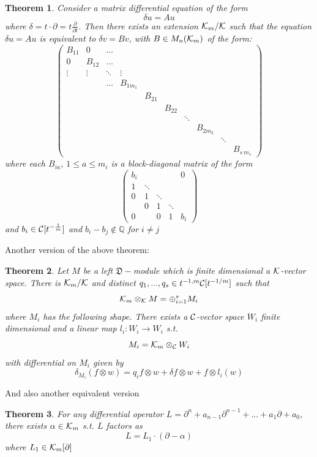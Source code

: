 \documentclass[11pt]{article}
\newtheorem{thm}{Theorem}[section]
\newcommand{\pd}{\partial}
\newcommand{\ratl}{\mathbb Q}
\newcommand{\frakd}{{\mathfrak D}}
\newcommand{\calc}{{\cal C}}
\newcommand{\calk}{{\cal K}}
\newcommand{\lrta}{\longrightarrow}
\begin{document}
\begin{thm}\label{thm:version1}
Consider a matrix differential equation of the form 
$$
\delta u= Au
$$
where $\delta =t\cdot \pd=t\frac{\pd}{\pd t}$. Then there exists an extension $\calk_m/\calk$ such that the equation $\delta u= Au$ is equivalent to $\delta v= B v$, with $B\in M_n(\calk_m) $ of the form:
$$
\begin{pmatrix}
B_{11} & 0 & \dots  &  &  &  &  &  &  & \\
0 & B_{12} & \dots  &  &  &  &  &  &  & \\
\vdots  & \vdots  & \ddots  & \vdots  &  &  &  &  &  & \\
 &  & \dots  & B_{1m_{1}} &  &  &  &  &  & \\
 &  &  &  & B_{21} &  &  &  &  & \\
 &  &  &  &  & B_{22} &  &  &  & \\
 &  &  &  &  &  & \ddots  &  &  & \\
 &  &  &  &  &  &  & B_{2m_{2}} &  & \\
 &  &  &  &  &  &  &  & \ddots  & \\
 &  &  &  &  &  &  &  &  & B_{s\ m_{s}}
\end{pmatrix}
$$
where each $B_{i a}$, $1\leq a\leq m_i$ is a block-diagonal matrix of the form 
$$
\begin{pmatrix}
b_{i} &  &  &  & 0\\
1 & \ddots  &  &  & \\
0 & 1 & \ddots  &  & \\
 & 0 & 1 & \ddots  & \\
0 &  & 0 & 1 & b_{i}
\end{pmatrix}
$$
and $b_i\in \calc[t^{-\frac{1}{m}}]$ and $b_i-b_j\notin \ratl $ for $i\neq j$
\end{thm}
Another version of the above theorem:
\begin{thm}\label{thm:version2}
Let $M$ be a left $\frakd-$module which is finite dimensional a $\calk$-vector space. There is $\calk_m/\calk$ and distinct $q_1,...,q_s\in t^{-1,m}\calc[t^{-1/m}]$ such that 
$$
\calk_m\otimes_\calk M=\oplus^s_{i=1} M_i
$$
where $M_i$ has the following shape. There exists a $\calc$-vector space $W_i$ finite dimensional and a linear map $l_i:W_i\lrta W_i$ s.t.
$$
M_i=\calk_m\otimes_\calc W_i
$$
with differential on $M_i$ given by 
$$
\delta_{M_i}(f\otimes w)=q_i f\otimes w+\delta f\otimes w+f\otimes l_i(w)
$$
\end{thm}
And also another equivalent version
\begin{thm}\label{thm:version3}
For any differential operator $L=\pd^n+a_{n-1}\pd^{n-1}+...+a_1\pd+a_0$, there exists $\alpha\in\calk_m$ s.t. $L$ factors as 
$$
L=L_1\cdot(\pd-\alpha)
$$
where $L_1\in\calk_m[\pd]$
\end{thm}
\end{document}
